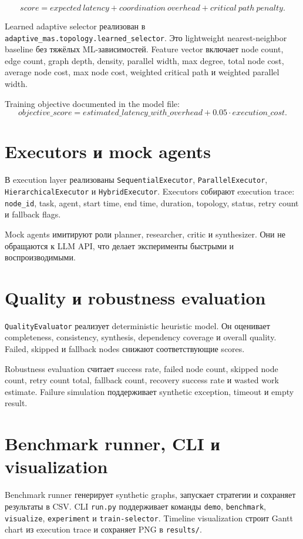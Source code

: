 \documentclass[12pt,a4paper]{report}
\newcommand{\code}[1]{\texttt{#1}}
\begin{document}
\[
score = expected\ latency + coordination\ overhead + critical\ path\ penalty.
\]

Learned adaptive selector реализован в \code{adaptive\_mas.topology.learned\_selector}. Это lightweight nearest-neighbor baseline без тяжёлых ML-зависимостей. Feature vector включает node count, edge count, graph depth, density, parallel width, max degree, total node cost, average node cost, max node cost, weighted critical path и weighted parallel width.

Training objective documented in the model file:
\[
objective\_score = estimated\_latency\_with\_overhead + 0.05 \cdot execution\_cost.
\]

\section{Executors и mock agents}

В execution layer реализованы \code{SequentialExecutor}, \code{ParallelExecutor}, \code{HierarchicalExecutor} и \code{HybridExecutor}. Executors собирают execution trace: \code{node\_id}, task, agent, start time, end time, duration, topology, status, retry count и fallback flags.

Mock agents имитируют роли planner, researcher, critic и synthesizer. Они не обращаются к LLM API, что делает эксперименты быстрыми и воспроизводимыми.

\section{Quality и robustness evaluation}

\code{QualityEvaluator} реализует deterministic heuristic model. Он оценивает completeness, consistency, synthesis, dependency coverage и overall quality. Failed, skipped и fallback nodes снижают соответствующие scores.

Robustness evaluation считает success rate, failed node count, skipped node count, retry count total, fallback count, recovery success rate и wasted work estimate. Failure simulation поддерживает synthetic exception, timeout и empty result.

\section{Benchmark runner, CLI и visualization}

Benchmark runner генерирует synthetic graphs, запускает стратегии и сохраняет результаты в CSV. CLI \code{run.py} поддерживает команды \code{demo}, \code{benchmark}, \code{visualize}, \code{experiment} и \code{train-selector}. Timeline visualization строит Gantt chart из execution trace и сохраняет PNG в \code{results/}.
\end{document}
